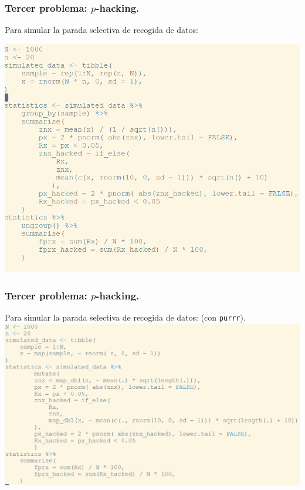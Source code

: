 \documentclass[9pt]{beamer}
\begin{document}
\begin{frame}
  \frametitle{Tercer problema: $p$-hacking.}
  \begin{overlayarea}{\textwidth}{\textheight}
  Para simular la parada selectiva de recogida de datos:
  \begin{center}
    \includegraphics[height=0.9\textheight]{images/R-script-2}
  \end{center}
\end{overlayarea}
\end{frame}

\begin{frame}
  \frametitle{Tercer problema: $p$-hacking.}
    \begin{overlayarea}{\textwidth}{\textheight}
  Para simular la parada selectiva de recogida de datos: \alert{(con
  {\tt purrr})}.\\
\hspace*{-0.8cm}\includegraphics[width=1.2\textwidth]{images/R-script-2_purrr}
\end{overlayarea}
\end{frame}
\end{document}
